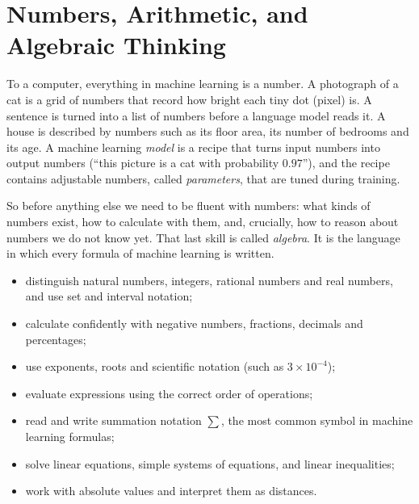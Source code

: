 \chapter{Numbers, Arithmetic, and Algebraic Thinking}\label{ch:numbers}

\begin{motivation}
To a computer, everything in machine learning is a number. A photograph of a
cat is a grid of numbers that record how bright each tiny dot (pixel) is. A
sentence is turned into a list of numbers before a language model reads it. A
house is described by numbers such as its floor area, its number of bedrooms
and its age. A machine learning \emph{model} is a recipe that turns input
numbers into output numbers (``this picture is a cat with probability
$0.97$''), and the recipe contains adjustable numbers, called
\emph{parameters}, that are tuned during training.

So before anything else we need to be fluent with numbers: what kinds of
numbers exist, how to calculate with them, and, crucially, how to reason
about numbers we do not know yet. That last skill is called \emph{algebra}. It
is the language in which every formula of machine learning is written.
\end{motivation}

\begin{objectives}
\begin{itemize}
  \item distinguish natural numbers, integers, rational numbers and real numbers,
    and use set and interval notation;
  \item calculate confidently with negative numbers, fractions, decimals and
    percentages;
  \item use exponents, roots and scientific notation (such as $3\times10^{-4}$);
  \item evaluate expressions using the correct order of operations;
  \item read and write summation notation $\sum$, the most common symbol in
    machine learning formulas;
  \item solve linear equations, simple systems of equations, and linear
    inequalities;
  \item work with absolute values and interpret them as distances.
\end{itemize}
\end{objectives}


